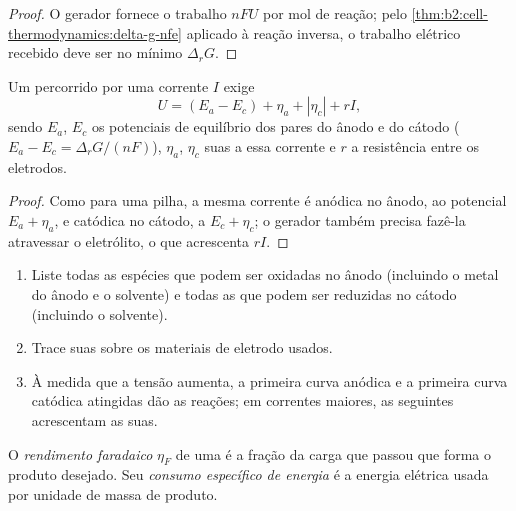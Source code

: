 \begin{proof}
O gerador fornece o trabalho $nFU$ por mol de reação; pelo
\cref{thm:b2:cell-thermodynamics:delta-g-nfe} aplicado à reação inversa, o
trabalho elétrico recebido deve ser no mínimo $\Delta_r G$.
\end{proof}

\begin{proposition}\label{prop:b2:batteries-electrolysis:electrolysis-voltage}
Um  percorrido por uma corrente $I$ exige
\[
  U = (E_a - E_c) + \eta_a + |\eta_c| + rI ,
\]
sendo $E_a$, $E_c$ os potenciais de equilíbrio dos pares do ânodo e do cátodo
($E_a - E_c = \Delta_r G/(nF)$), $\eta_a$, $\eta_c$ suas  a essa
corrente e $r$ a resistência entre os eletrodos.
\end{proposition}

\begin{proof}
Como para uma pilha, a mesma corrente é anódica no ânodo, ao potencial $E_a +
\eta_a$, e catódica no cátodo, a $E_c + \eta_c$; o gerador também precisa
fazê-la atravessar o eletrólito, o que acrescenta $rI$.
\end{proof}

\begin{method}\label{met:b2:batteries-electrolysis:predict-electrolysis}
\begin{enumerate}
  \item Liste todas as espécies que podem ser oxidadas no ânodo (incluindo o
        metal do ânodo e o solvente) e todas as que podem ser reduzidas no
        cátodo (incluindo o solvente).
  \item Trace suas  sobre os materiais de eletrodo usados.
  \item À medida que a tensão aumenta, a primeira curva anódica e a primeira
        curva catódica atingidas dão as reações; em correntes maiores, as
        seguintes acrescentam as suas.
\end{enumerate}
\end{method}

\begin{definition}\label{def:b2:batteries-electrolysis:faradaic-efficiency}
O \emph{rendimento faradaico} $\eta_F$ de uma
 é a fração da carga que passou que forma o produto desejado. Seu
\emph{consumo específico de energia}
é a energia elétrica usada por unidade de massa de produto.
\end{definition}

